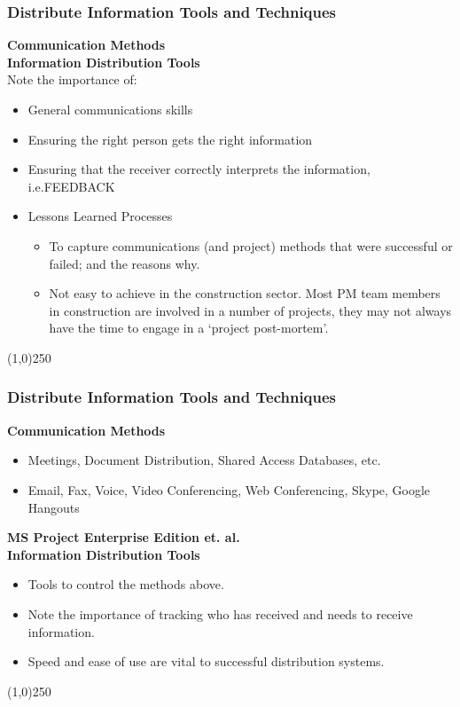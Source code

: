 \begin{frame}
\frametitle{Distribute Information \hfill\hfill Tools and Techniques}
\textbf{Communication Methods}\\
\textbf{Information Distribution Tools}\\
Note the importance of:\\
\begin{itemize}
	\item General communications skills
	\item Ensuring the right person gets the right information
	\item Ensuring that the receiver correctly interprets the information, i.e.FEEDBACK
	\item Lessons Learned Processes
	\begin{itemize}
		\item To capture communications (and project) methods that were successful or failed; and the reasons why.
		\item Not easy to achieve in the construction sector. Most PM team members in construction are involved in a number of projects, they may not always have the time to engage in a `project post-mortem'.
	\end{itemize}
\end{itemize}
\end{frame}\begin{center}\line(1,0){250}\end{center}


\begin{frame}
\frametitle{Distribute Information \hfill\hfill Tools and Techniques}
\textbf{Communication Methods}\\
\begin{itemize}
	\item Meetings, Document Distribution, Shared Access Databases, etc.
	\item Email, Fax, Voice, Video Conferencing, Web Conferencing, Skype, Google Hangouts 
\end{itemize}
\textbf{MS Project Enterprise Edition et. al.}\\
\textbf{Information Distribution Tools}\\
\begin{itemize}
	\item Tools to control the methods above.
	\item Note the importance of tracking who has received and needs to receive information.
	\item Speed and ease of use are vital to successful distribution systems.
\end{itemize}
\end{frame}\begin{center}\line(1,0){250}\end{center}




